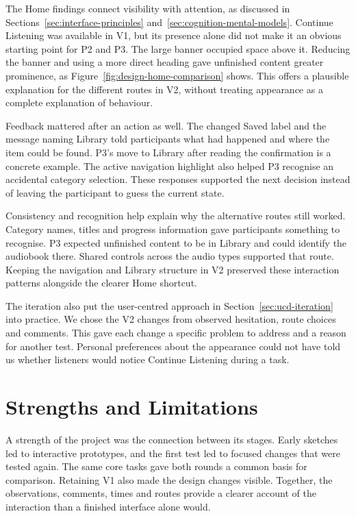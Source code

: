 The Home findings connect visibility with attention, as discussed in
Sections~\ref{sec:interface-principles} and~\ref{sec:cognition-mental-models}.
Continue Listening was available in V1, but its presence alone did not make
it an obvious starting point for P2 and P3. The large banner occupied space
above it. Reducing the banner and using a more direct heading gave unfinished
content greater prominence, as Figure~\ref{fig:design-home-comparison}
shows. This offers a plausible explanation for the different routes in V2,
without treating appearance as a complete explanation of behaviour.

Feedback mattered after an action as well. The changed Saved label and the
message naming Library told participants what had happened and where the
item could be found. P3's move to Library after reading the confirmation
is a concrete example. The active navigation highlight also helped P3
recognise an accidental category selection. These responses supported the
next decision instead of leaving the participant to guess the current state.

Consistency and recognition help explain why the alternative routes still
worked. Category names, titles and progress information gave participants
something to recognise. P3 expected unfinished content to be in Library
and could identify the audiobook there. Shared controls across the audio
types supported that route. Keeping the navigation and Library structure
in V2 preserved these interaction patterns alongside the clearer Home
shortcut.

The iteration also put the user-centred approach in
Section~\ref{sec:ucd-iteration} into practice. We chose the V2 changes from
observed hesitation, route choices and comments. This gave each change a
specific problem to address and a reason for another test. Personal
preferences about the appearance could not have told us whether listeners
would notice Continue Listening during a task.

\section{Strengths and Limitations}
\label{sec:discussion-strengths-limitations}

A strength of the project was the connection between its stages. Early
sketches led to interactive prototypes, and the first test led to focused
changes that were tested again. The same core tasks gave both rounds a
common basis for comparison. Retaining V1 also made the design changes
visible. Together, the observations, comments, times and routes provide a
clearer account of the interaction than a finished interface alone would.

